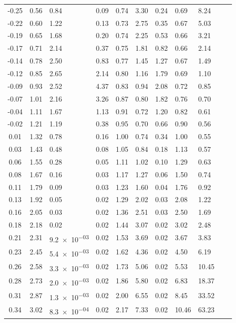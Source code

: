 {\begin{longtable}[c]{c|llllllllll}
    -0.25 & 0.56 & 0.84 & 0.09 & 0.74 & 3.30 & 0.24 & 0.69 & 8.24 \\
    -0.22 & 0.60 & 1.22 & 0.13 & 0.73 & 2.75 & 0.35 & 0.67 & 5.03 \\
    -0.19 & 0.65 & 1.68 & 0.20 & 0.74 & 2.25 & 0.53 & 0.66 & 3.21 \\
    -0.17 & 0.71 & 2.14 & 0.37 & 0.75 & 1.81 & 0.82 & 0.66 & 2.14 \\
    -0.14 & 0.78 & 2.50 & 0.83 & 0.77 & 1.45 & 1.27 & 0.67 & 1.49 \\
    -0.12 & 0.85 & 2.65 & 2.14 & 0.80 & 1.16 & 1.79 & 0.69 & 1.10 \\
    -0.09 & 0.93 & 2.52 & 4.37 & 0.83 & 0.94 & 2.08 & 0.72 & 0.85 \\
    -0.07 & 1.01 & 2.16 & 3.26 & 0.87 & 0.80 & 1.82 & 0.76 & 0.70 \\
    -0.04 & 1.11 & 1.67 & 1.13 & 0.91 & 0.72 & 1.20 & 0.82 & 0.61 \\
    -0.02 & 1.21 & 1.19 & 0.38 & 0.95 & 0.70 & 0.66 & 0.90 & 0.56 \\
    0.01 & 1.32 & 0.78 & 0.16 & 1.00 & 0.74 & 0.34 & 1.00 & 0.55 \\
    0.03 & 1.43 & 0.48 & 0.08 & 1.05 & 0.84 & 0.18 & 1.13 & 0.57 \\
    0.06 & 1.55 & 0.28 & 0.05 & 1.11 & 1.02 & 0.10 & 1.29 & 0.63 \\
    0.08 & 1.67 & 0.16 & 0.03 & 1.17 & 1.27 & 0.06 & 1.50 & 0.74 \\
    0.11 & 1.79 & 0.09 & 0.03 & 1.23 & 1.60 & 0.04 & 1.76 & 0.92 \\
    0.13 & 1.92 & 0.05 & 0.02 & 1.29 & 2.02 & 0.03 & 2.08 & 1.22 \\
    0.16 & 2.05 & 0.03 & 0.02 & 1.36 & 2.51 & 0.03 & 2.50 & 1.69 \\
    0.18 & 2.18 & 0.02 & 0.02 & 1.44 & 3.07 & 0.02 & 3.02 & 2.48 \\
    0.21 & 2.31 & \num{9.2e-03} & 0.02 & 1.53 & 3.69 & 0.02 & 3.67 & 3.83 \\
    0.23 & 2.45 & \num{5.4e-03} & 0.02 & 1.62 & 4.36 & 0.02 & 4.50 & 6.19 \\
    0.26 & 2.58 & \num{3.3e-03} & 0.02 & 1.73 & 5.06 & 0.02 & 5.53 & 10.45 \\
    0.28 & 2.73 & \num{2.0e-03} & 0.02 & 1.86 & 5.80 & 0.02 & 6.83 & 18.37 \\
    0.31 & 2.87 & \num{1.3e-03} & 0.02 & 2.00 & 6.55 & 0.02 & 8.45 & 33.52 \\
    0.34 & 3.02 & \num{8.3e-04} & 0.02 & 2.17 & 7.33 & 0.02 & 10.46 & 63.23 \\

\end{longtable}}
